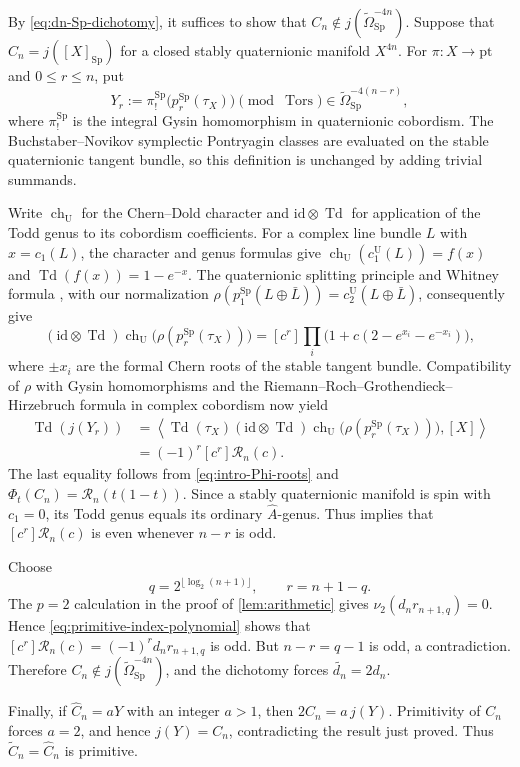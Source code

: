 \documentclass[14pt,dvipsnames]{extarticle}
\makeatletter
\numberwithin{equation}{subsection}
\theoremstyle{plain}
\theoremstyle{definition}
\theoremstyle{definition}
\renewenvironment{proof}[1][\proofname]{
 \par\pushQED{\qed}\normalfont
 \topsep6\p@\@plus6\p@\relax
 \trivlist\item[\hskip\labelsep\bfseries\itshape #1\@addpunct{.}]
}{\popQED\endtrivlist\@endpefalse}
\DeclareMathOperator{\Td}{Td}
\DeclareMathOperator{\Tors}{Tors}
\newcommand{\OmSpfree}{\widetilde{\Omega}_{\mathrm{Sp}}}
\newcommand{\U}{\mathrm U}
\newcommand{\Sp}{\mathrm{Sp}}
\makeatother
\begin{document}
\begin{proof}[Proof of \cref{thm:sp-denominator}]
By \eqref{eq:dn-Sp-dichotomy}, it suffices to show that
$C_n\notin j(\OmSpfree^{-4n})$.
Suppose that $C_n=j([X]_{\Sp})$ for a closed stably quaternionic
manifold $X^{4n}$. For $\pi\colon X\to\mathrm{pt}$ and $0\leq r\leq n$, put
\[
 Y_r:=\pi_!^{\Sp}\bigl(p_r^{\Sp}(\tau_X)\bigr)
 \pmod{\Tors}\in\OmSpfree^{-4(n-r)},
\]
where $\pi_!^{\Sp}$ is the integral Gysin homomorphism in quaternionic
cobordism. The Buchstaber--Novikov symplectic Pontryagin classes are evaluated
on the stable quaternionic
tangent bundle, so this definition is unchanged by adding trivial summands.

Write $\operatorname{ch}_{\U}$ for the Chern--Dold character and
$\mathrm{id}\otimes\Td$ for application of the Todd genus to its cobordism
coefficients. For a complex line bundle $L$ with $x=c_1(L)$, the character
and genus formulas \cite[(3), (45)]{BV24} give
$\operatorname{ch}_{\U}(c_1^{\U}(L))=f(x)$ and
$\Td(f(x))=1-e^{-x}$. The quaternionic splitting principle and Whitney
formula \cite[\S1]{PW18}, with our normalization
$\rho(p_1^{\Sp}(L\oplus\bar L))=c_2^{\U}(L\oplus\bar L)$, consequently give
\[
 (\mathrm{id}\otimes\Td)\operatorname{ch}_{\U}
 \bigl(\rho(p_r^{\Sp}(\tau_X))\bigr)
 =[c^r]\prod_i\bigl(1+c(2-e^{x_i}-e^{-x_i})\bigr),
\]
where $\pm x_i$ are the formal Chern roots of the stable tangent bundle.
Compatibility of $\rho$ with Gysin homomorphisms and the
Riemann--Roch--Grothendieck--Hirzebruch formula in complex cobordism
\cite[Theorem~2.4, formula~(29)]{BV24} now yield
\[
 \begin{aligned}
 \Td(j(Y_r))
 &=\left\langle
   \Td(\tau_X)(\mathrm{id}\otimes\Td)\operatorname{ch}_{\U}
   \bigl(\rho(p_r^{\Sp}(\tau_X))\bigr),[X]
   \right\rangle\\
 &=(-1)^r[c^r]\mathcal R_n(c).
 \end{aligned}
\]
The last equality follows from \eqref{eq:intro-Phi-roots} and
$\Phi_t(C_n)=\mathcal R_n(t(1-t))$. Since a stably quaternionic manifold is
spin with $c_1=0$, its Todd genus equals its ordinary $\widehat A$-genus.
Thus \cite[Corollary~2(ii), p.~279]{AH59} implies that
$[c^r]\mathcal R_n(c)$ is even whenever $n-r$ is odd.

Choose
\[
 q=2^{\lfloor\log_2(n+1)\rfloor},
 \qquad r=n+1-q.
\]
The $p=2$ calculation in the proof of \cref{lem:arithmetic} gives
$\nu_2(d_nr_{n+1,q})=0$. Hence
\eqref{eq:primitive-index-polynomial} shows that
$[c^r]\mathcal R_n(c)=(-1)^r d_nr_{n+1,q}$ is odd. But
$n-r=q-1$ is odd, a contradiction. Therefore
$C_n\notin j(\OmSpfree^{-4n})$, and the dichotomy forces
$\widetilde{d_n}=2d_n$.

Finally, if $\widehat C_n=aY$ with an integer $a>1$, then
$2C_n=a\,j(Y)$. Primitivity of $C_n$ forces $a=2$, and hence
$j(Y)=C_n$, contradicting the result just proved. Thus
$\widetilde C_n=\widehat C_n$ is primitive.
\end{proof}
\end{document}
